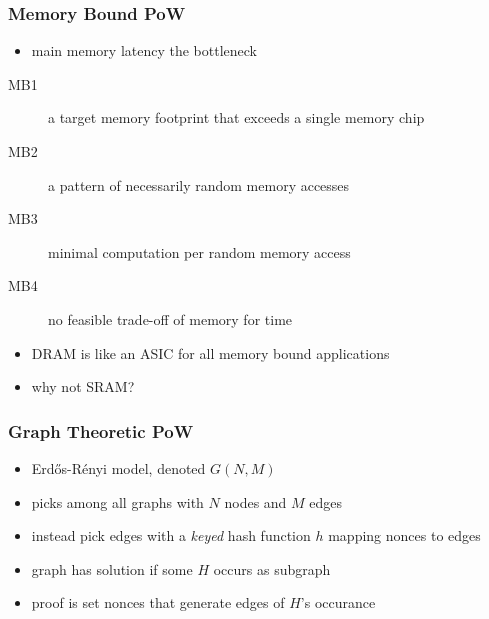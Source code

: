 \documentclass{beamer}
\begin{document}
\begin{frame}
\frametitle{Memory Bound PoW}
\begin{itemize}
\item main memory latency the bottleneck
\end{itemize}
\begin{description}
\item[MB1] a target memory footprint that exceeds a single memory chip
\item[MB2] a pattern of necessarily random memory accesses
\item[MB3] minimal computation per random memory access
\item[MB4] no feasible trade-off of memory for time
\end{description}
\begin{itemize}
\item DRAM is like an ASIC for all memory bound applications
\item why not SRAM?
\end{itemize}
\end{frame}


\begin{frame}
\frametitle{Graph Theoretic PoW}
\begin{itemize}
\item Erd\H{o}s-R\'{e}nyi model, denoted $G(N,M)$
\item picks among all graphs with $N$ nodes and $M$ edges
\item instead pick edges with a {\em keyed} hash function $h$
mapping nonces to edges
\item graph has \alert{solution} if some $H$ occurs as subgraph
\item \alert{proof} is set nonces that generate edges of $H$'s occurance
\end{itemize}
\end{frame}
\end{document}
